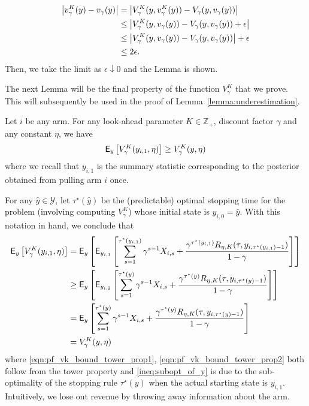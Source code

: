 \begin{myproof}[Proof.]
	\begin{align*}
	\left| v^K_\gamma(y) - v_\gamma(y) \right| & = \left| V^K_\gamma(y, v^K_\gamma(y)) -  V_\gamma(y, v_\gamma(y)) \right| \\
	 &  \le \left| V^K_\gamma(y, v_\gamma(y)) -  V_\gamma(y, v_\gamma(y)) + \epsilon\right| \\
	 &  \le \left| V^K_\gamma(y, v_\gamma(y)) -  V_\gamma(y, v_\gamma(y))\right| + \epsilon \\
	 & \le 2\epsilon.
	\end{align*}
	Then, we take the limit as $\epsilon \downarrow 0$ and the Lemma is shown.
\end{myproof}


The next Lemma will be the final property of the function $V^K_\gamma$ that we prove. This will subsequently be used in the proof of Lemma~\ref{lemma:underestimation}.
\begin{lemma} \label{lemma:vk_bound}
	Let $i$ be any arm. For any look-ahead parameter $K \in \mathbb{Z}_+$, discount factor $\gamma$ and any constant $\eta$, we have
	\begin{equation*}
	\mathsf{E}_y\left[V^K_\gamma(y_{i,1}, \eta) \right] \ge V^K_\gamma(y, \eta)
	\end{equation*}
	where we recall that $y_{i,1}$ is the summary statistic corresponding to the posterior obtained from pulling arm $i$ once.
\end{lemma}
\begin{myproof}[Proof.]
	For any $\hat y \in \mathcal{Y}$, let $\tau^\star(\hat y)$ be the (predictable) optimal stopping time for the problem (involving computing $V^K_\gamma$) whose initial state is $y_{i,0} = \hat y$. With this notation in hand, we conclude that
	\begin{align}
	\mathsf{E}_y \left[V^K_\gamma(y_{i,1}, \eta) \right] & = \mathsf{E}_y\left[\mathsf{E}_{y_{i,1}}\left[\sum_{s=1}^{\tau^\star(y_{i,1})} \gamma^{s-1} X_{i,s} + \frac{\gamma^{\tau^\star(y_{i,1})} R_{\eta, K}(\tau, y_{i,\tau^\star(y_{i,1})-1})}{1-\gamma} \right]\right]\label{eqn:pf_vk_bound_tower_prop1}  \\
	& \ge  \mathsf{E}_y\left[\mathsf{E}_{y_{i,2}}\left[\sum_{s=1}^{\tau^\star(y)} \gamma^{s-1} X_{i,s} + \frac{\gamma^{\tau^\star(y)} R_{\eta, K}(\tau, y_{i,\tau^\star(y)-1})}{1-\gamma}\right] \right] \label{ineq:subopt_of_y}\\
	& = \mathsf{E}_y\left[\sum_{s=1}^{\tau^\star(y)} \gamma^{s-1} X_{i,s} + \frac{\gamma^{\tau^\star(y)} R_{\eta, K}(\tau, y_{i,\tau^\star(y)-1})}{1-\gamma}\right] \label{eqn:pf_vk_bound_tower_prop2} \\
	& = V^K_\gamma(y, \eta) \nonumber
	\end{align}
	where \eqref{eqn:pf_vk_bound_tower_prop1}, \eqref{eqn:pf_vk_bound_tower_prop2} both follow from the tower property and \eqref{ineq:subopt_of_y} is due to the sub-optimality of the stopping rule $\tau^\star(y)$ when the actual starting state is $y_{i,1}$. Intuitively, we lose out revenue by throwing away information about the arm.
\end{myproof}


